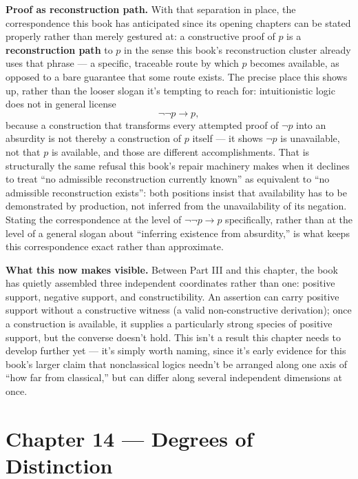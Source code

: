 \textbf{Proof as reconstruction path.} With that separation in place, the
correspondence this book has anticipated since its opening chapters can
be stated properly rather than merely gestured at: a constructive proof
of \(p\) is a \textbf{reconstruction path} to \(p\) in the sense this book's
reconstruction cluster already uses that phrase --- a specific, traceable
route by which \(p\) becomes available, as opposed to a bare guarantee that
some route exists. The precise place this shows up, rather than the
looser slogan it's tempting to reach for: intuitionistic logic does not
in general license
\[\neg\neg p \to p,\]
because a construction that transforms every attempted proof of \(\neg p\)
into an absurdity is not thereby a construction of \(p\) itself --- it shows
\(\neg p\) is unavailable, not that \(p\) is available, and those are
different accomplishments. That is structurally the same refusal this
book's repair machinery makes when it declines to treat ``no admissible
reconstruction currently known'' as equivalent to ``no admissible
reconstruction exists'': both positions insist that availability has to be
demonstrated by production, not inferred from the unavailability of its
negation. Stating the correspondence at the level of \(\neg\neg p \to p\)
specifically, rather than at the level of a general slogan about
``inferring existence from absurdity,'' is what keeps this correspondence
exact rather than approximate.

\textbf{What this now makes visible.} Between Part III and this chapter, the
book has quietly assembled three independent coordinates rather than
one: positive support, negative support, and constructibility. An
assertion can carry positive support without a constructive witness (a
valid non-constructive derivation); once a construction is available, it
supplies a particularly strong species of positive support, but the
converse doesn't hold. This isn't a result this chapter needs to develop
further yet --- it's simply worth naming, since it's early evidence for
this book's larger claim that nonclassical logics needn't be arranged
along one axis of ``how far from classical,'' but can differ along several
independent dimensions at once.

\hypertarget{chapter-14-degrees-of-distinction}{%
\chapter*{Chapter 14 --- Degrees of Distinction}
\label{chapter-14-degrees-of-distinction}}

